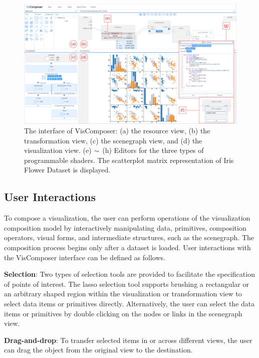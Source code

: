 \begin{figure}
  \centering
  \includegraphics[width=0.98\linewidth]{images/system.pdf}
  \caption{The interface of VisComposer: (a) the resource view, (b) the transformation view, (c) the scenegraph view, and (d) the visualization view. \newline(e) $\scriptsize{\sim}$ (h) Editors for the three types of programmable shaders.
  The scatterplot matrix representation of Iris Flower Dataset is displayed.}
  \label{fg:interface}
\end{figure}

\subsection{User Interactions}
To compose a visualization, the user can perform operations of the visualization composition model by interactively manipulating data, primitives, composition operators, visual forms, and intermediate structures, such as the scenegraph.  The composition process begins only after a dataset is loaded.  User interactions with the VisComposer interface can be defined as follows.

\noindent \textbf{Selection}: Two types of selection tools are provided to facilitate the specification of points of interest. The lasso selection tool supports brushing a rectangular or an arbitrary shaped region within the visualization or transformation view to select data items or primitives directly. Alternatively, the user can select the data items or primitives by double clicking on the nodes or links in the scenegraph view.

\noindent \textbf{Drag-and-drop}: To transfer selected items in or across different views, the user can drag the object from the original view to the destination.

